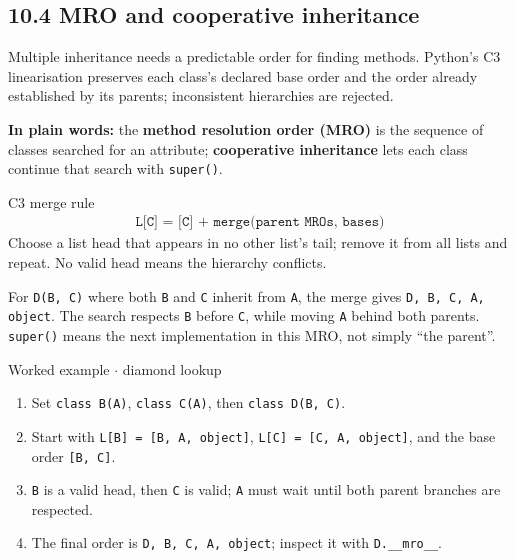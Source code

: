 \documentclass[11pt]{article}
\begin{document}
\begin{keepsection}
\section{10.4 MRO and cooperative inheritance}

Multiple inheritance needs a predictable order for finding methods. Python’s C3 linearisation preserves each class’s declared base order and the order already established by its parents; inconsistent hierarchies are rejected.

\begin{plainbox}\textbf{In plain words:} the \textbf{method resolution order (MRO)} is the sequence of classes searched for an attribute; \textbf{cooperative inheritance} lets each class continue that search with \texttt{super()}.\end{plainbox}

\begin{equationcard}{C3 merge rule}
\[ \begin{gathered} \texttt{L[C] = [C] + merge(parent MROs, bases)} \end{gathered} \]
{\small Choose a list head that appears in no other list’s tail; remove it from all lists and repeat. No valid head means the hierarchy conflicts.}
\end{equationcard}

For \texttt{D(B, C)} where both \texttt{B} and \texttt{C} inherit from \texttt{A}, the merge gives \texttt{D, B, C, A, object}. The search respects \texttt{B} before \texttt{C}, while moving \texttt{A} behind both parents. \texttt{super()} means the next implementation in this MRO, not simply “the parent”.

\begin{workedbox}{Worked example \ensuremath{\cdot} diamond lookup}
\begin{enumerate}
\item Set \texttt{class B(A)}, \texttt{class C(A)}, then \texttt{class D(B, C)}.
\item Start with \texttt{L[B] = [B, A, object]}, \texttt{L[C] = [C, A, object]}, and the base order \texttt{[B, C]}.
\item \texttt{B} is a valid head, then \texttt{C} is valid; \texttt{A} must wait until both parent branches are respected.
\item The final order is \texttt{D, B, C, A, object}; inspect it with \texttt{D.\_\_mro\_\_}.
\end{enumerate}
\end{workedbox}


\end{keepsection}
\end{document}
